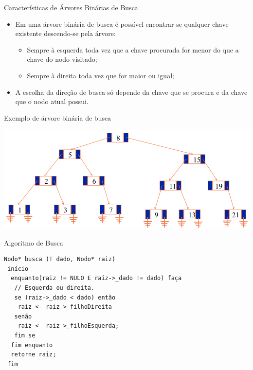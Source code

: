 \documentclass[12pt,table,xcolor={dvipsnames}]{beamer}
\begin{document}
\begin{frame}[fragile]{Características de Árvores Binárias de Busca}
          \begin{itemize}
          \item Em uma árvore binária de busca é possível encontrar-se qualquer chave existente descendo-se pela árvore:
          \begin{itemize}
          \item Sempre à esquerda toda vez que a chave procurada for menor do que a chave do nodo visitado;
          \item Sempre à direita toda vez que for maior ou igual;
          \end{itemize}
          \item A escolha da direção de busca só depende da chave que se procura e da chave que o nodo atual possui.
       	  \end{itemize}
\end{frame}



\begin{frame}[fragile]{Exemplo de árvore binária de busca}
\begin{center}
\includegraphics[scale=.3]{arv1.png} 
\end{center}
\end{frame}

\begin{frame}[fragile]{Algoritmo de Busca}
          \begin{lstlisting}
Nodo* busca (T dado, Nodo* raiz)
 início
  enquanto(raiz != NULO E raiz->_dado != dado) faça
   // Esquerda ou direita.
   se (raiz->_dado < dado) então
    raiz <- raiz->_filhoDireita
   senão
    raiz <- raiz->_filhoEsquerda;
   fim se
  fim enquanto
  retorne raiz;
 fim
 \end{lstlisting}
\end{frame} 
\end{document}
